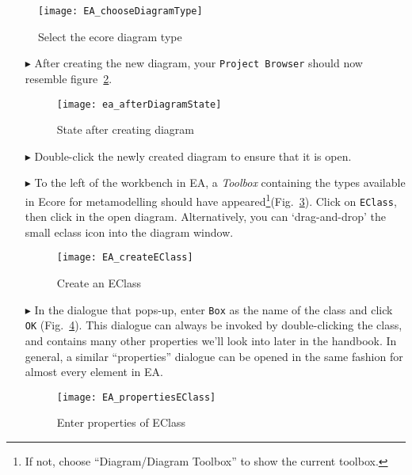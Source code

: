 \pagebreak

\begin{figure}[htbp]
	\centering
  \texttt{[image: EA\_chooseDiagramType]}
	\caption{Select the ecore diagram type}
	\label{fig:diagram_type}
\end{figure}
\FloatBarrier

\begin{itemize}
 
\item[$\blacktriangleright$] After creating the new diagram, your  \texttt{Project Browser} should now resemble figure~\ref{fig:diagram_completed}.

\begin{figure}[htbp]
	\centering
  \texttt{[image: ea\_afterDiagramState]}
	\caption{State after creating diagram}
	\label{fig:diagram_completed}
\end{figure}


\item[$\blacktriangleright$] Double-click the newly created diagram to ensure that it is open.


\item[$\blacktriangleright$] To the left of the workbench in EA, a \emph{Toolbox} containing the types available in Ecore for metamodelling should have
appeared\footnote{If not, choose ``Diagram/Diagram Toolbox'' to show the current toolbox.}(Fig.~\ref{fig:eclass}). Click on \texttt{EClass}, then click in the
open diagram. Alternatively, you can `drag-and-drop' the small eclass icon into the diagram window.

\begin{figure}[htbp]
	\centering
  \texttt{[image: EA\_createEClass]}
	\caption{Create an EClass}
	\label{fig:eclass}
\end{figure}



\item[$\blacktriangleright$] In the dialogue that pops-up, enter \texttt{Box} as the name of the class and click \texttt{OK} (Fig.~\ref{fig:eclass_properties}).
This dialogue can always be invoked by double-clicking the class, and contains many other properties we'll look into later in the handbook.
In general, a similar ``properties'' dialogue can be opened in the same fashion for almost every element in EA.

\begin{figure}[htbp]
	\centering
  \texttt{[image: EA\_propertiesEClass]}
	\caption{Enter properties of EClass}
	\label{fig:eclass_properties}
\end{figure}


\end{itemize}

